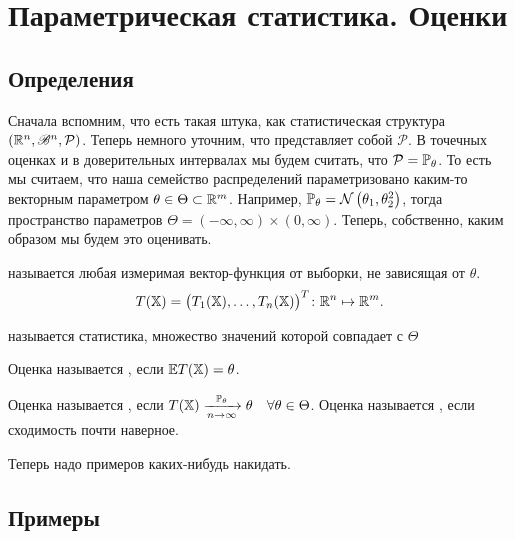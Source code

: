 \documentclass[../TV&MS.tex]{subfiles}
\begin{document}
    
\section{Параметрическая статистика. Оценки}

\subsection{Определения}

Сначала вспомним, что есть такая штука, как статистическая структура
$\left( \mathbb{R}^{n}, \mathscr{B}^{n}, \mathcal{P} \right)$.
Теперь немного уточним, что представляет собой $\mathcal{P}$.
В точечных оценках и в доверительных интервалах мы будем считать,
что $\mathcal{P} = \mathbb{P}_\theta$.
То есть мы считаем, что наша семейство распределений параметризовано каким-то векторным параметром $\theta \in \Theta \subset \mathbb{R}^{m}$.
Например, $\mathbb{P}_\theta = \mathcal{N}\left( \theta_1, \theta_2^2 \right)$,
тогда пространство параметров $\Theta = (-\infty, \infty) \times (0, \infty)$.
Теперь, собственно, каким образом мы будем это оценивать.

\begin{Def}\label{ms:e:def:stat}
     называется любая измеримая вектор-функция от выборки, не зависящая от $\theta$.
    \[
        T(\mathbb{X}) = \bigl( T_1(\mathbb{X}),\ldots, T_n(\mathbb{X}) \bigr)^{T} \colon \mathbb{R}^{n} \mapsto \mathbb{R}^{m}
    .\] 
\end{Def} 

\begin{Def}\label{ms:e:def:estimate}
     называется статистика, множество значений которой совпадает с $\Theta$
\end{Def} 

\begin{Def}\label{ms:e:def:unbiased}
    Оценка называется , если $\mathbb{E} T(\mathbb{X}) = \theta$.
\end{Def} 

\begin{Def}\label{ms:e:def:consistent}
    Оценка называется , если $T(\mathbb{X}) \xrightarrow[n\rightarrow \infty]{\mathbb{P}_\theta} \theta \quad \forall \theta \in \Theta$.
    Оценка называется , если сходимость почти наверное.
\end{Def} 

Теперь надо примеров каких-нибудь накидать.

\subsection{Примеры}
\end{document}
